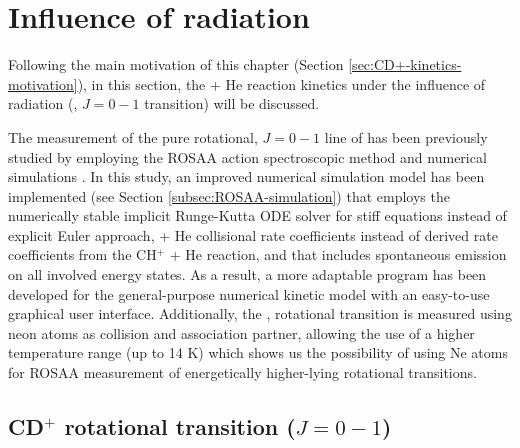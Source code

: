 \section{Influence of radiation}
\label{subsec:rate-constants-laserOn}

Following the main motivation of this chapter (Section
\ref{sec:CD+-kinetics-motivation}), in this section, the \CD + He reaction
kinetics under the influence of radiation (\CD, $J=0-1$ transition) will be
discussed.

The measurement of the pure rotational, $J=0-1$ line of \CD has been previously
studied by employing the ROSAA action spectroscopic method and numerical
simulations \cite{kluge_state-selective_2016, Brunken2017}. In this study, an
improved numerical simulation model has been implemented (see Section
\ref{subsec:ROSAA-simulation}) that employs the numerically stable implicit
Runge-Kutta ODE solver for stiff equations instead of explicit Euler approach,
\CD + He collisional rate coefficients \cite{Werfelli2017} instead of derived
rate coefficients from the CH$^+$ + He reaction, and that includes spontaneous
emission on all involved energy states. As a result, a more adaptable program
has been developed for the general-purpose numerical kinetic model with an
easy-to-use graphical user interface. Additionally, the \CD, \CDline rotational
transition is measured using neon atoms as collision and association partner,
allowing the use of a higher temperature range (up to 14 K) which shows us the
possibility of using Ne atoms for ROSAA measurement of energetically
higher-lying rotational transitions.

\subsection{CD\texorpdfstring{$^+$ }\ rotational transition (\texorpdfstring{$J=0-1$}\ )}
\label{subsec:CD+-spectroscopy}



